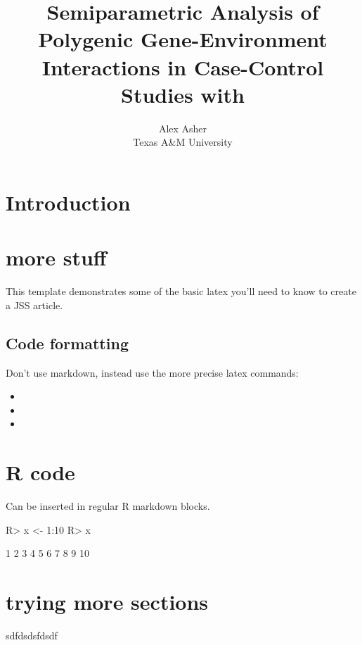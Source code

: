 \documentclass[nojss]{jss}
\author{
Alex Asher\\Texas A\&M University
}
\title{Semiparametric Analysis of Polygenic Gene-Environment Interactions in
Case-Control Studies with \pkg{caseControlGE}}
\providecommand{\tightlist}{%
  \setlength{\itemsep}{0pt}\setlength{\parskip}{0pt}}
\begin{document}
\begin{titlepage}
\end{titlepage}

\section{Introduction}\label{introduction}

\section{more stuff}

This template demonstrates some of the basic latex you'll need to know
to create a JSS article.

\subsection{Code formatting}\label{code-formatting}

Don't use markdown, instead use the more precise latex commands:

\begin{itemize}
\tightlist
\item
\item
\item
\end{itemize}

\section{R code}\label{r-code}

Can be inserted in regular R markdown blocks.

\begin{CodeChunk}

\begin{CodeInput}
R> x <- 1:10
R> x
\end{CodeInput}

\begin{CodeOutput}
 [1]  1  2  3  4  5  6  7  8  9 10
\end{CodeOutput}
\end{CodeChunk}

\section{trying more sections}\label{trying-more-sections}

sdfdsdsfdsdf
\end{document}
